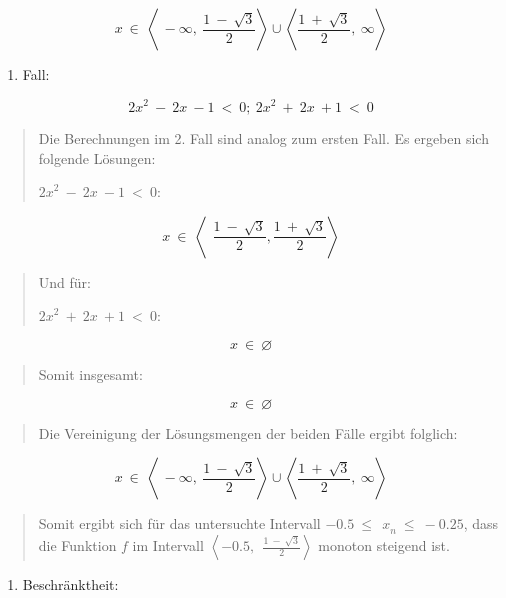 \documentclass[a4paper, 12pt]{book}
\begin{document}
\begin{longtable}[]
\begin{minipage}[b]{\linewidth}
\[x\  \in \ \left\langle \  - \infty,\ \frac{1\  - \ \sqrt{3}}{2} \right\rangle \cup \left\langle \frac{1\  + \ \sqrt{3}}{2},\ \infty \right\rangle\]

\begin{enumerate}
\def\labelenumi{\arabic{enumi}.}
\setcounter{enumi}{1}
\item
  Fall:
\end{enumerate}

\[{2x}^{2}\  - \ 2x\  - 1\  < \ 0;\ {2x}^{2}\  + \ 2x\  + 1\  < \ 0\]

\begin{quote}
Die Berechnungen im 2. Fall sind analog zum ersten Fall. Es ergeben sich
folgende Lösungen:

\({2x}^{2}\  - \ 2x\  - 1\  < \ 0\):
\end{quote}

\[x\  \in \ \left\langle \ \ \frac{1\  - \ \sqrt{3}}{2},\frac{1\  + \ \sqrt{3}}{2} \right\rangle\]

\begin{quote}
Und für:

\({2x}^{2}\  + \ 2x\  + 1\  < \ 0\):
\end{quote}

\[x\  \in \ \varnothing\]

\begin{quote}
Somit insgesamt:
\end{quote}

\[x\  \in \ \varnothing\]

\begin{quote}
Die Vereinigung der Lösungsmengen der beiden Fälle ergibt folglich:
\end{quote}

\[x\  \in \ \left\langle \  - \infty,\ \frac{1\  - \ \sqrt{3}}{2} \right\rangle \cup \left\langle \frac{1\  + \ \sqrt{3}}{2},\ \infty \right\rangle\]

\begin{quote}
Somit ergibt sich für das untersuchte Intervall
\(- 0.5\ {\leq \ \ x}_{n}\  \leq \  - 0.25\), dass die Funktion \(f\) im
Intervall
\(\left\langle - 0.5,\ \ \frac{1\  - \ \sqrt{3}}{2} \right\rangle\)
monoton steigend ist.
\end{quote}

\begin{enumerate}
\def\labelenumi{\arabic{enumi})}
\setcounter{enumi}{1}
\item
  Beschränktheit:
\end{enumerate}


\end{minipage}
\end{longtable}
\end{document}
